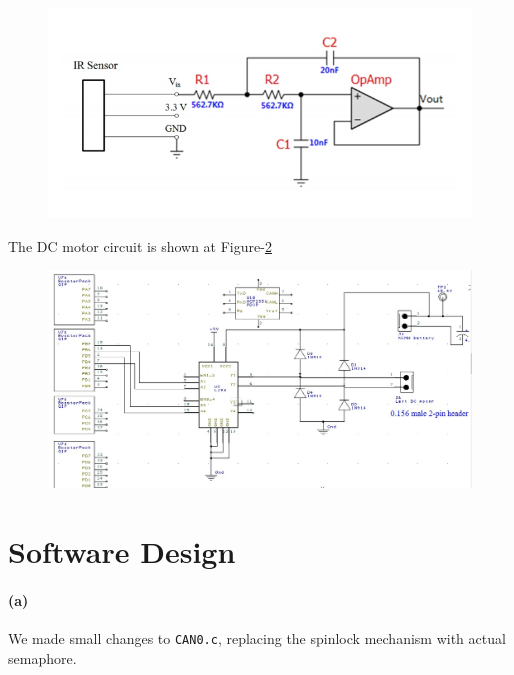 \documentclass[a4paper]{article}
\newlength{\pic}
\begin{document}
\setlength{\pic}{0.8\textwidth}
\begin{figure}[htp]
\center
\includegraphics[width=\pic]{circuits/IR_Circuit}
\caption{ }
\label{ir}
\end{figure}

The DC motor circuit is shown at Figure-\ref{motor}

\setlength{\pic}{0.8\textwidth}
\begin{figure}[htp]

\center
\includegraphics[width=\pic]{circuits/PWM_Circuit}
\caption{ }
\label{motor}
\end{figure}

\newpage

\section{Software Design} 

\paragraph{(a)} We made small changes to \texttt{CAN0.c}, replacing the spinlock  mechanism with actual semaphore.

\lstset{language=C, style=MyCStyle}

\end{document}
